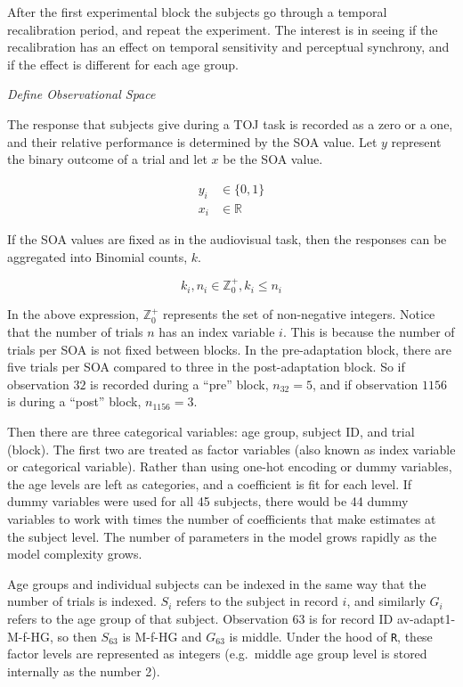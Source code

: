 \documentclass[11pt, oneside, openany]{scrbook}
\begin{document}
After the first experimental block the subjects go through a temporal recalibration period, and repeat the experiment. The interest is in seeing if the recalibration has an effect on temporal sensitivity and perceptual synchrony, and if the effect is different for each age group.

\emph{Define Observational Space}

The response that subjects give during a TOJ task is recorded as a zero or a one, and their relative performance is determined by the SOA value. Let \(y\) represent the binary outcome of a trial and let \(x\) be the SOA value.


\begin{align*}
y_i &\in \lbrace 0, 1\rbrace \\
x_i &\in \mathbb{R}
\end{align*}

If the SOA values are fixed as in the audiovisual task, then the responses can be aggregated into Binomial counts, \(k\).

\[k_i, n_i \in \mathbb{Z}_0^+, k_i \le n_i\]

In the above expression, \(\mathbb{Z}_0^+\) represents the set of non-negative integers. Notice that the number of trials \(n\) has an index variable \(i\). This is because the number of trials per SOA is not fixed between blocks. In the pre-adaptation block, there are five trials per SOA compared to three in the post-adaptation block. So if observation \(32\) is recorded during a ``pre'' block, \(n_{32} = 5\), and if observation \(1156\) is during a ``post'' block, \(n_{1156} = 3\).

Then there are three categorical variables: age group, subject ID, and trial (block). The first two are treated as factor variables (also known as index variable or categorical variable). Rather than using one-hot encoding or dummy variables, the age levels are left as categories, and a coefficient is fit for each level. If dummy variables were used for all 45 subjects, there would be 44 dummy variables to work with times the number of coefficients that make estimates at the subject level. The number of parameters in the model grows rapidly as the model complexity grows.

Age groups and individual subjects can be indexed in the same way that the number of trials is indexed. \(S_i\) refers to the subject in record \(i\), and similarly \(G_i\) refers to the age group of that subject. Observation \(63\) is for record ID av-adapt1-M-f-HG, so then \(S_{63}\) is M-f-HG and \(G_{63}\) is middle. Under the hood of \texttt{R}, these factor levels are represented as integers (e.g.~middle age group level is stored internally as the number 2).
\end{document}
